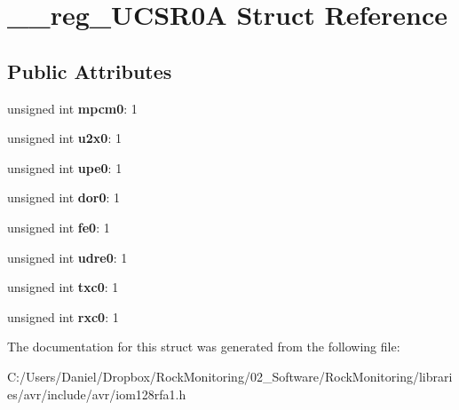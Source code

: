 \hypertarget{struct____reg___u_c_s_r0_a}{}\section{\+\_\+\+\_\+reg\+\_\+\+U\+C\+S\+R0A Struct Reference}
\label{struct____reg___u_c_s_r0_a}
\subsection*{Public Attributes}
\begin{DoxyCompactItemize}
\item 
unsigned int {\bfseries mpcm0}\+: 1\hypertarget{struct____reg___u_c_s_r0_a_a92aa32946c4d81a825833bbc6f06e164}{}\label{struct____reg___u_c_s_r0_a_a92aa32946c4d81a825833bbc6f06e164}

\item 
unsigned int {\bfseries u2x0}\+: 1\hypertarget{struct____reg___u_c_s_r0_a_a111fa5aa7654fbdfd4764e754b06f4cf}{}\label{struct____reg___u_c_s_r0_a_a111fa5aa7654fbdfd4764e754b06f4cf}

\item 
unsigned int {\bfseries upe0}\+: 1\hypertarget{struct____reg___u_c_s_r0_a_ac5a2ca50d4988cf5e4ff5e368f08692f}{}\label{struct____reg___u_c_s_r0_a_ac5a2ca50d4988cf5e4ff5e368f08692f}

\item 
unsigned int {\bfseries dor0}\+: 1\hypertarget{struct____reg___u_c_s_r0_a_ab6f08670d3159b6543a0e40b80b5c33a}{}\label{struct____reg___u_c_s_r0_a_ab6f08670d3159b6543a0e40b80b5c33a}

\item 
unsigned int {\bfseries fe0}\+: 1\hypertarget{struct____reg___u_c_s_r0_a_ae3ae5d6f4da1f6508816f62bb27823c4}{}\label{struct____reg___u_c_s_r0_a_ae3ae5d6f4da1f6508816f62bb27823c4}

\item 
unsigned int {\bfseries udre0}\+: 1\hypertarget{struct____reg___u_c_s_r0_a_afc193449726ccf38ea13c5c28af62db3}{}\label{struct____reg___u_c_s_r0_a_afc193449726ccf38ea13c5c28af62db3}

\item 
unsigned int {\bfseries txc0}\+: 1\hypertarget{struct____reg___u_c_s_r0_a_ac115bf469d5a9d86c1620f160d693701}{}\label{struct____reg___u_c_s_r0_a_ac115bf469d5a9d86c1620f160d693701}

\item 
unsigned int {\bfseries rxc0}\+: 1\hypertarget{struct____reg___u_c_s_r0_a_a6a7fb32ef80199062e66b8407c2a5c16}{}\label{struct____reg___u_c_s_r0_a_a6a7fb32ef80199062e66b8407c2a5c16}

\end{DoxyCompactItemize}


The documentation for this struct was generated from the following file\+:\begin{DoxyCompactItemize}
\item 
C\+:/\+Users/\+Daniel/\+Dropbox/\+Rock\+Monitoring/02\+\_\+\+Software/\+Rock\+Monitoring/libraries/avr/include/avr/iom128rfa1.\+h\end{DoxyCompactItemize}
